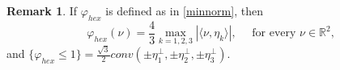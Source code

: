 \documentclass{interact}
\numberwithin{equation}{section}
\theoremstyle{definition}
\newtheorem{oss}[thm]{Remark}
\newcommand{\R}{\mathbb{R}}
\renewcommand{\H}{\mathcal{H}}
\renewcommand{\epsilon}{\varepsilon}
\def\e{\epsilon}
\begin{document}
\begin{oss}
If $\varphi_{hex}$ is defined as in \eqref{minnorm}, then
\begin{equation}
\varphi_{hex}(\nu)=\frac{4}{3}\max_{k=1,2,3}|\langle \nu, \eta_k\rangle|,\quad \mbox{ for every $\nu\in\R^2$,}
\end{equation}
and $\{\varphi_{hex}\leq1\}=\displaystyle\frac{\sqrt{3}}{2}conv(\pm \eta_1^\perp,\pm \eta_2^\perp, \pm \eta_3^\perp)$.
\end{oss}

\end{document}
